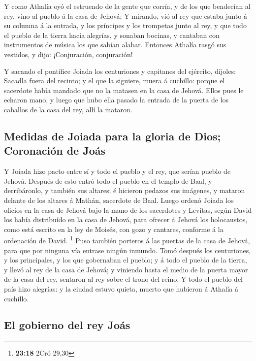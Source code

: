  Y como Athalía oyó el estruendo de la gente que corría, y
de los que bendecían al rey, vino al pueblo á la casa de Jehová;
 Y mirando, vió al rey que estaba junto á su columna á la
entrada, y los príncipes y los trompetas junto al rey, y que todo el
pueblo de la tierra hacía alegrías, y sonaban bocinas, y cantaban con
instrumentos de música los que sabían alabar. Entonces Athalía rasgó sus
vestidos, y dijo: ¡Conjuración, conjuración!

 Y sacando el pontífice Joiada los centuriones y capitanes
del ejército, díjoles: Sacadla fuera del recinto; y el que la siguiere,
muera á cuchillo: porque el sacerdote había mandado que no la matasen en
la casa de Jehová.  Ellos pues le echaron mano, y luego que
hubo ella pasado la entrada de la puerta de los caballos de la casa del
rey, allí la mataron.

\hypertarget{medidas-de-joiada-para-la-gloria-de-dios-coronaciuxf3n-de-jouxe1s}{%
\subsection{Medidas de Joiada para la gloria de Dios; Coronación de
Joás}\label{medidas-de-joiada-para-la-gloria-de-dios-coronaciuxf3n-de-jouxe1s}}

 Y Joiada hizo pacto entre sí y todo el pueblo y el rey,
que serían pueblo de Jehová.  Después de esto entró todo el
pueblo en el templo de Baal, y derribáronlo, y también sus altares; é
hicieron pedazos sus imágenes, y mataron delante de los altares á
Mathán, sacerdote de Baal.  Luego ordenó Joiada los oficios
en la casa de Jehová bajo la mano de los sacerdotes y Levitas, según
David los había distribuído en la casa de Jehová, para ofrecer á Jehová
los holocaustos, como está escrito en la ley de Moisés, con gozo y
cantares, conforme á la ordenación de David. \footnote{\textbf{23:18}
  2Cró 29,30}  Puso también porteros á las puertas de la
casa de Jehová, para que por ninguna vía entrase ningún inmundo.
 Tomó después los centuriones, y los principales, y los que
gobernaban el pueblo; y á todo el pueblo de la tierra, y llevó al rey de
la casa de Jehová; y viniendo hasta el medio de la puerta mayor de la
casa del rey, sentaron al rey sobre el trono del reino.  Y
todo el pueblo del país hizo alegrías: y la ciudad estuvo quieta, muerto
que hubieron á Athalía á cuchillo.

\hypertarget{el-gobierno-del-rey-jouxe1s}{%
\subsection{El gobierno del rey
Joás}\label{el-gobierno-del-rey-jouxe1s}}

